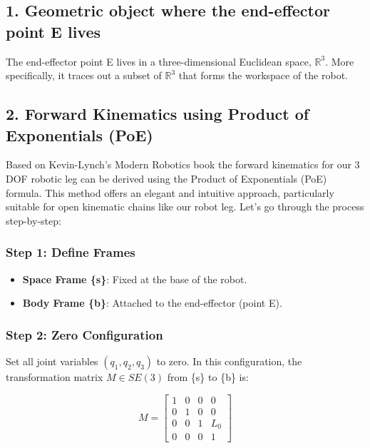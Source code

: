 \begin{solution}
	
	\subsection*{1. Geometric object where the end-effector point E lives}
	
	The end-effector point E lives in a three-dimensional Euclidean space, $\mathbb{R}^3$. More specifically, it traces out a subset of $\mathbb{R}^3$ that forms the workspace of the robot.
	
	\subsection*{2. Forward Kinematics using Product of Exponentials (PoE)} \label{sec:SE3}

Based on Kevin-Lynch's Modern Robotics book \cite{lynch2017modern} the forward kinematics for our 3 DOF robotic leg can be derived using the Product of Exponentials (PoE) formula. This method offers an elegant and intuitive approach, particularly suitable for open kinematic chains like our robot leg. Let's go through the process step-by-step:

\subsubsection*{Step 1: Define Frames}
\begin{itemize}
    \item \textbf{Space Frame \{s\}}: Fixed at the base of the robot.
    \item \textbf{Body Frame \{b\}}: Attached to the end-effector (point E).
\end{itemize}

\subsubsection*{Step 2: Zero Configuration}
Set all joint variables $(q_1, q_2, q_3)$ to zero. In this configuration, the transformation matrix $M \in SE(3)$ from \{s\} to \{b\} is:

\begin{equation}
    M = \begin{bmatrix}
    1 & 0 & 0 & 0 \\
    0 & 1 & 0 & 0 \\
    0 & 0 & 1 & L_0 \\
    0 & 0 & 0 & 1
    \end{bmatrix}
\end{equation}


\end{solution}
